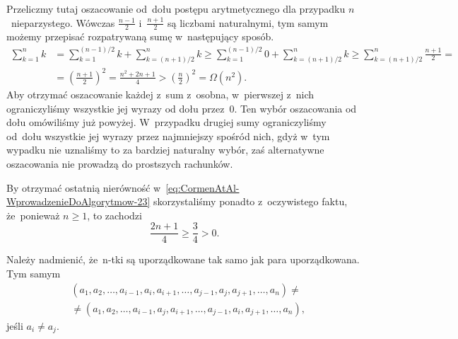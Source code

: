 \documentclass[a4paper,11pt]{article}
\numberwithin{equation}{section}
\begin{document}
\noindent
{} Przeliczmy tutaj oszacowanie od~dołu postępu arytmetycznego
dla przypadku $n$~nieparzystego. Wówczas $\frac{ n - 1 }{ 2 }$
i~$\frac{ n + 1 }{ 2 }$ są liczbami naturalnymi, tym samym możemy przepisać
rozpatrywaną sumę w~następujący sposób.
\begin{equation}
  \label{eq:CormenAtAl-WprowadzenieDoAlgorytmow-23}
  \begin{split}
    \sum_{ k = 1 }^{ n } k
    &=
      \sum_{ k = 1 }^{ ( n - 1 ) / 2 } k + \sum_{ k = ( n + 1 ) / 2 }^{ n } k \geq
      \sum_{ k = 1 }^{ ( n - 1 ) / 2 } 0 + \sum_{ k = ( n + 1 ) / 2 }^{ n } k \geq
      \sum_{ k = ( n + 1 ) / 2 }^{ n } \frac{ n + 1 }{ 2 } = \\[0.5em]
    &= \left( \frac{ n + 1 }{ 2 } \right)^{ 2 } =
      \frac{ n^{ 2 } + 2n + 1 }{ 4 } >
      \left( \frac{ n }{ 2 } \right )^{ 2 } = \Omega( n^{ 2 } ).
  \end{split}
\end{equation}
Aby otrzymać oszacowanie każdej z~sum z~osobna, w~pierwszej z~nich
ograniczyliśmy wszystkie jej wyrazy od dołu przez~$0$. Ten wybór oszacowania
od dołu omówiliśmy już powyżej. W~przypadku drugiej sumy ograniczyliśmy
od~dołu wszystkie jej wyrazy przez najmniejszy spośród nich, gdyż w~tym
wypadku nie uznaliśmy to za bardziej naturalny wybór, zaś alternatywne
oszacowania nie prowadzą do prostszych rachunków.

By otrzymać ostatnią nierówność
w~\eqref{eq:CormenAtAl-WprowadzenieDoAlgorytmow-23} skorzystaliśmy ponadto
z~oczywistego faktu, że~ponieważ $n \geq 1$, to zachodzi
\begin{equation}
  \label{eq:CormenAtAl-WprowadzenieDoAlgorytmow-24}
  \frac{ 2n + 1 }{ 4 } \geq \frac{ 3 }{ 4 } > 0.
\end{equation}

\VerSpaceFour





\noindent
{} Należy nadmienić, że~n-tki są uporządkowane tak samo jak para
uporządkowana. Tym samym
\begin{equation}
  \label{eq:CormenAtAl-WprowadzenieDoAlgorytmow-25}
  \begin{split}
    &( a_{ 1 }, a_{ 2 }, \ldots, a_{ i - 1 }, a_{ i }, a_{ i + 1 }, \ldots, a_{ j - 1 },
    a_{ j }, a_{ j + 1 }, \ldots, a_{ n } ) \neq \\
    &\neq ( a_{ 1 }, a_{ 2 }, \ldots, a_{ i - 1 }, a_{ j }, a_{ i + 1 }, \ldots,
    a_{ j - 1 }, a_{ i }, a_{ j + 1 }, \ldots, a_{ n } ),
  \end{split}
\end{equation}
jeśli $a_{ i } \neq a_{ j }$.
\end{document}
